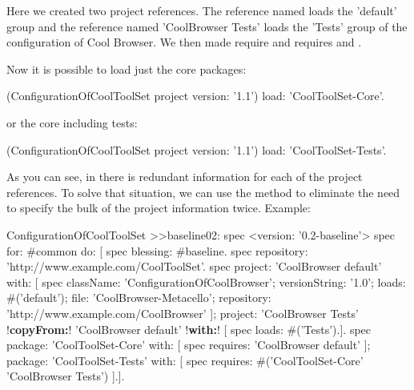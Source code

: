 \documentclass[a4paper,10pt,twoside]{book}
\begin{document}
Here we created two project references. The reference named  loads the 'default' group and the reference named 'CoolBrowser Tests'  loads the 'Tests' group of the configuration of Cool Browser. We then made  require  and  requires  and .

Now it is possible to load just the core packages:

\begin{code}{}
(ConfigurationOfCoolToolSet project version: '1.1') load: 'CoolToolSet-Core'.
\end{code} 
or the core including tests:
 
\begin{code}{}
  (ConfigurationOfCoolToolSet project version: '1.1') load: 'CoolToolSet-Tests'.
\end{code}

As you can see, in  there is redundant information for each of the project references. To solve that situation, we can use the  method to eliminate the need to specify the bulk of the project information twice. Example:

\begin{code}{}
ConfigurationOfCoolToolSet >>baseline02: spec 
       <version: '0.2-baseline'>
       spec for: #common do: [
              spec blessing: #baseline.
              spec repository: 'http://www.example.com/CoolToolSet'.
              spec project: 'CoolBrowser default' with: [
                            spec
                                   className: 'ConfigurationOfCoolBrowser';
                                   versionString: '1.0';
                                   loads: #('default');
                                   file: 'CoolBrowser-Metacello';
                                   repository: 'http://www.example.com/CoolBrowser' ];
                     project: 'CoolBrowser Tests' 
                            !\textbf{copyFrom:}! 'CoolBrowser default' 
                            !\textbf{with:}! [ spec loads: #('Tests').].
              spec 
                     package: 'CoolToolSet-Core' with: [ spec requires: 'CoolBrowser default' ];
                     package: 'CoolToolSet-Tests' with: [ 
                            spec requires: #('CoolToolSet-Core' 'CoolBrowser Tests') ].].                                   
\end{code}
\end{document}
